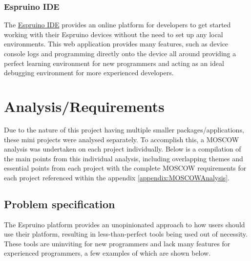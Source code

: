 \documentclass{l4proj}
\begin{document}
\subsection{Espruino IDE}
The \href{https://www.espruino.com/ide/}{Espruino IDE} provides an online platform for developers to get started working with their Espruino devices without the need to set up any local environments. This web application provides many features, such as device console logs and programming directly onto the device all around providing a perfect learning environment for new programmers and acting as an ideal debugging environment for more experienced developers.


\chapter{Analysis/Requirements}

\text Due to the nature of this project having multiple smaller packages/applications, these mini projects were analysed separately. To accomplish this, a MOSCOW analysis was undertaken on each project individually. Below is a compilation of the main points from this individual analysis, including overlapping themes and essential points from each project with the complete MOSCOW requirements for each project referenced within the appendix \ref{appendix:MOSCOWAnalysis}.

\section{Problem specification}
The Espruino platform provides an unopinionated approach to how users should use their platform, resulting in less-than-perfect tools being used out of necessity. These tools are uninviting for new programmers and lack many features for experienced programmers, a few examples of which are shown below.
\end{document}
